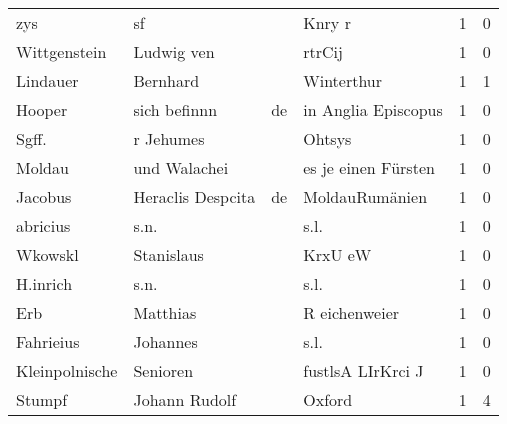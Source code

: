 \begin{tabular}{llllrr}
                      zys &                                 sf &             &                                      Knry r &          1 &         0 \\
             Wittgenstein &                         Ludwig ven &             &                                      rtrCij &          1 &         0 \\
                 Lindauer &                           Bernhard &             &                                  Winterthur &          1 &         1 \\
                   Hooper &                       sich befinnn &          de &                         in Anglia Episcopus &          1 &         0 \\
                    Sgff. &                          r Jehumes &             &                                      Ohtsys &          1 &         0 \\
                   Moldau &                       und Walachei &             &                         es je einen Fürsten &          1 &         0 \\
                  Jacobus &                  Heraclis Despcita &          de &                              MoldauRumänien &          1 &         0 \\
                 abricius &                               s.n. &             &                                        s.l. &          1 &         0 \\
                  Wkowskl &                         Stanislaus &             &                                     KrxU eW &          1 &         0 \\
                 H.inrich &                               s.n. &             &                                        s.l. &          1 &         0 \\
                      Erb &                           Matthias &             &                               R eichenweier &          1 &         0 \\
                Fahrieius &                           Johannes &             &                                        s.l. &          1 &         0 \\
           Kleinpolnische &                           Senioren &             &                           fustlsA LIrKrci J &          1 &         0 \\
                   Stumpf &                      Johann Rudolf &             &                                      Oxford &          1 &         4 \\

\end{tabular}
